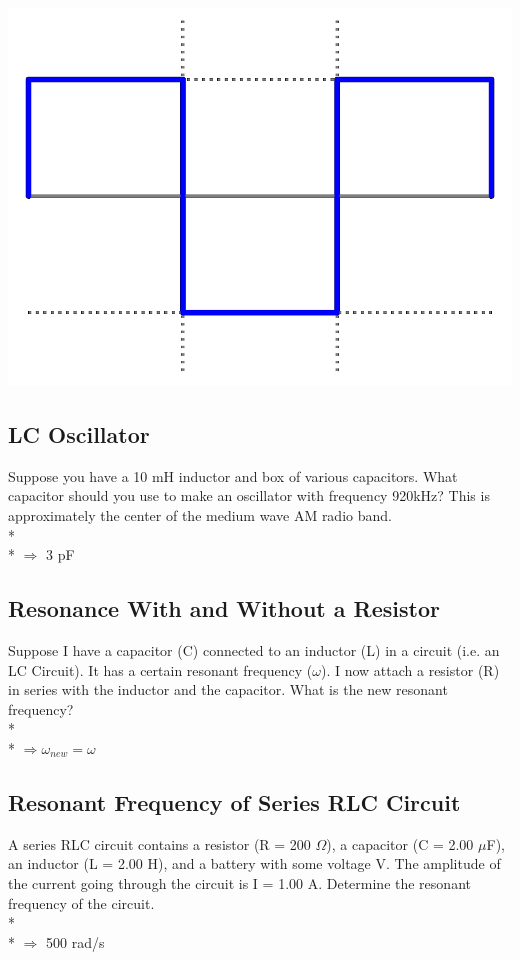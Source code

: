 \documentclass[11pt]{article}
\begin{document}
\begin{center}
\includegraphics[scale=0.15]{Images/square_wave.png}
\end{center}

\subsection{LC Oscillator}
Suppose you have a 10 mH inductor and box of various capacitors.  What capacitor should you use to make an oscillator with frequency 920kHz?  This is approximately the center of the medium wave AM radio band.\\* \\*
$\Rightarrow$ 3 pF

\subsection{Resonance With and Without a Resistor}
Suppose I have a capacitor (C) connected to an inductor (L) in a circuit (i.e. an LC Circuit).  It has a certain resonant frequency ($\omega$).  I now attach a resistor (R) in series with the inductor and the capacitor.  What is the new resonant frequency? \\* \\*
$\Rightarrow \omega_{new} = \omega$

\subsection{Resonant Frequency of Series RLC Circuit}
A series RLC circuit contains a resistor (R = 200 $\Omega$), a capacitor (C = 2.00 $\mu$F), an inductor (L = 2.00 H), and a battery with some voltage V.  The amplitude of the current going through the circuit is I = 1.00 A.  Determine the resonant frequency of the circuit. \\* \\*
$\Rightarrow $ 500 rad/s
\end{document}
